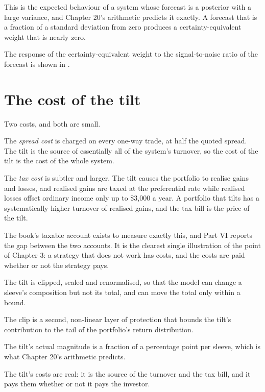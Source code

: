 This is the expected behaviour of a system whose forecast is a posterior
with a large variance, and Chapter 20's arithmetic predicts it exactly. A
forecast that is a fraction of a standard deviation from zero produces a
certainty-equivalent weight that is nearly zero.

The response of the certainty-equivalent weight to the signal-to-noise ratio of the forecast is shown in .

\section{The cost of the tilt}

Two costs, and both are small.

The \emph{spread cost} is charged on every one-way trade, at half the
quoted spread. The tilt is the source of essentially all of the system's
turnover, so the cost of the tilt is the cost of the whole system.

The \emph{tax cost} is subtler and larger. The tilt causes the portfolio
to realise gains and losses, and realised gains are taxed at the
preferential rate while realised losses offset ordinary income only up to
\$3,000 a year. A portfolio that tilts has a systematically higher
turnover of realised gains, and the tax bill is the price of the tilt.

The book's taxable account exists to measure exactly this, and Part VI
reports the gap between the two accounts. It is the clearest single
illustration of the point of Chapter 3: a strategy that does not work has
costs, and the costs are paid whether or not the strategy pays.

\begin{keytakeaways}
\item The tilt is clipped, scaled and renormalised, so that the model can
change a sleeve's composition but not its total, and can move the total
only within a bound.
\item The clip is a second, non-linear layer of protection that bounds the
tilt's contribution to the tail of the portfolio's return distribution.
\item The tilt's actual magnitude is a fraction of a percentage point per
sleeve, which is what Chapter 20's arithmetic predicts.
\item The tilt's costs are real: it is the source of the turnover and the
tax bill, and it pays them whether or not it pays the investor.
\end{keytakeaways}
